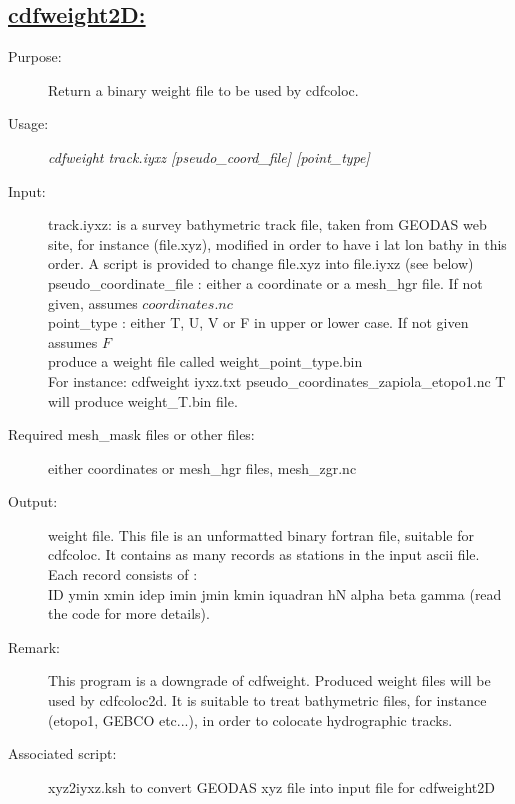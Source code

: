 \documentclass[a4paper,11pt]{article}
\begin{document}
\subsection*{\underline{cdfweight2D:}}
\begin{description}
\item[Purpose:] Return a binary weight file to be used by cdfcoloc.
\item[Usage:] {\em cdfweight  track.iyxz  [pseudo\_coord\_file] [point\_type]}
\item[Input:]  track.iyxz: is a survey bathymetric track file, taken from GEODAS web site, for instance (file.xyz), modified in order
      to have i lat lon bathy in this order. A script is provided to change file.xyz into file.iyxz (see below) \\
      pseudo\_coordinate\_file : either a coordinate or a mesh\_hgr file. If not given, assumes $coordinates.nc$ \\
      point\_type : either T, U, V or F in upper or lower case. If not given assumes $F$ \\
      produce a weight file called weight\_point\_type.bin \\
For instance: cdfweight  iyxz.txt  pseudo\_coordinates\_zapiola\_etopo1.nc T \\
will produce weight\_T.bin file.
\item[Required mesh\_mask files or other files:] either coordinates or mesh\_hgr files, mesh\_zgr.nc
\item[Output:] weight file.  This file is an unformatted binary fortran file, suitable for cdfcoloc. It contains as
 many records as stations in the input ascii file. Each record consists of :\\
ID ymin xmin idep imin jmin kmin iquadran hN alpha beta gamma (read the code for more details).\\ 
\item[Remark:]  This program is a downgrade of cdfweight. Produced weight files will be used by cdfcoloc2d. It is suitable to treat bathymetric files, for instance (etopo1, GEBCO etc...), in order to colocate hydrographic tracks.
\item[Associated script:] xyz2iyxz.ksh  to convert GEODAS xyz file into input file for cdfweight2D
\end{description}
\end{document}
